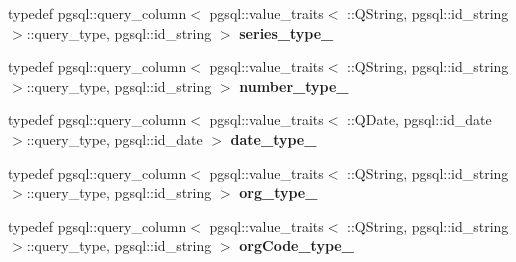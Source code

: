 \begin{DoxyCompactItemize}
\item 
typedef pgsql\+::query\+\_\+column$<$ pgsql\+::value\+\_\+traits$<$ \+::Q\+String, pgsql\+::id\+\_\+string $>$\+::query\+\_\+type, pgsql\+::id\+\_\+string $>$ {\bfseries series\+\_\+type\+\_\+}\hypertarget{structodb_1_1pointer__query__columns_3_01_1_1kpk_1_1data_1_1_person_00_01id__pgsql_00_01_a_01_4_1_1passport__class___a46d39b9aa631265f2029224b8762720b}{}\label{structodb_1_1pointer__query__columns_3_01_1_1kpk_1_1data_1_1_person_00_01id__pgsql_00_01_a_01_4_1_1passport__class___a46d39b9aa631265f2029224b8762720b}

\item 
typedef pgsql\+::query\+\_\+column$<$ pgsql\+::value\+\_\+traits$<$ \+::Q\+String, pgsql\+::id\+\_\+string $>$\+::query\+\_\+type, pgsql\+::id\+\_\+string $>$ {\bfseries number\+\_\+type\+\_\+}\hypertarget{structodb_1_1pointer__query__columns_3_01_1_1kpk_1_1data_1_1_person_00_01id__pgsql_00_01_a_01_4_1_1passport__class___a69e27555715bcaaa2a661988277ab351}{}\label{structodb_1_1pointer__query__columns_3_01_1_1kpk_1_1data_1_1_person_00_01id__pgsql_00_01_a_01_4_1_1passport__class___a69e27555715bcaaa2a661988277ab351}

\item 
typedef pgsql\+::query\+\_\+column$<$ pgsql\+::value\+\_\+traits$<$ \+::Q\+Date, pgsql\+::id\+\_\+date $>$\+::query\+\_\+type, pgsql\+::id\+\_\+date $>$ {\bfseries date\+\_\+type\+\_\+}\hypertarget{structodb_1_1pointer__query__columns_3_01_1_1kpk_1_1data_1_1_person_00_01id__pgsql_00_01_a_01_4_1_1passport__class___abbf1b0cc5174da6691edc49a19bd8e3d}{}\label{structodb_1_1pointer__query__columns_3_01_1_1kpk_1_1data_1_1_person_00_01id__pgsql_00_01_a_01_4_1_1passport__class___abbf1b0cc5174da6691edc49a19bd8e3d}

\item 
typedef pgsql\+::query\+\_\+column$<$ pgsql\+::value\+\_\+traits$<$ \+::Q\+String, pgsql\+::id\+\_\+string $>$\+::query\+\_\+type, pgsql\+::id\+\_\+string $>$ {\bfseries org\+\_\+type\+\_\+}\hypertarget{structodb_1_1pointer__query__columns_3_01_1_1kpk_1_1data_1_1_person_00_01id__pgsql_00_01_a_01_4_1_1passport__class___a12747467505de96a6680cd67a8d6603f}{}\label{structodb_1_1pointer__query__columns_3_01_1_1kpk_1_1data_1_1_person_00_01id__pgsql_00_01_a_01_4_1_1passport__class___a12747467505de96a6680cd67a8d6603f}

\item 
typedef pgsql\+::query\+\_\+column$<$ pgsql\+::value\+\_\+traits$<$ \+::Q\+String, pgsql\+::id\+\_\+string $>$\+::query\+\_\+type, pgsql\+::id\+\_\+string $>$ {\bfseries org\+Code\+\_\+type\+\_\+}\hypertarget{structodb_1_1pointer__query__columns_3_01_1_1kpk_1_1data_1_1_person_00_01id__pgsql_00_01_a_01_4_1_1passport__class___a9c66007b30693acdec156ebaae6a38ad}{}\label{structodb_1_1pointer__query__columns_3_01_1_1kpk_1_1data_1_1_person_00_01id__pgsql_00_01_a_01_4_1_1passport__class___a9c66007b30693acdec156ebaae6a38ad}

\end{DoxyCompactItemize}
